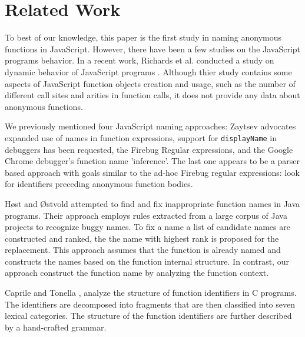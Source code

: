 \documentclass[10pt, preprint]{sigplanconf}
\begin{document}


\section{Related Work}

To best of our knowledge, this paper is the first study in naming anonymous functions in JavaScript. However, there have been a few studies on the JavaScript programs behavior. In a recent work, Richards et al. conducted a study on dynamic behavior of JavaScript programs \cite{Richards2}. Although thier study contains some aspects of JavaScript function objects creation and usage, such as the number of different call sites and arities in function calls, it does not provide any data about anonymous functions. 

We previously mentioned four JavaScript naming approaches: Zaytsev advocates expanded use of names in function expressions\cite{Zaytsev}, support for \verb|displayName| in debuggers has been requested\cite{DisplayName}, the Firebug Regular expressions, and the Google Chrome debugger's function name 'inference'\cite{ChromeInfer}. The last one appears to be a parser based approach with goals similar to the ad-hoc Firebug regular expressions: look for identifiers preceding anonymous function bodies. 

H{\o}st and {\O}stvold \cite{Host} attempted to find and fix inappropriate function names in Java programs. Their approach employs rules extracted from a large corpus of Java projects to recognize buggy names. To fix a name a list of candidate names are constructed and ranked, the the name with highest rank is proposed for the replacement. This approach assumes that the function is already named and constructs the names based on the function internal structure. In contrast, our approach construct the function name by analyzing the function context. 

Caprile and Tonella \cite{Caprile}, analyze the structure of function identifiers in C programs. The identifiers are decomposed into fragments that are then classified into seven lexical categories. The structure of the function identifiers are further described by a hand-crafted grammar.
\end{document}
